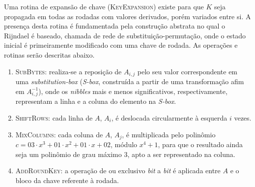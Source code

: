 \documentclass{ufsctex/ufsctex}
\begin{document}
Uma rotina de expansão de chave (\textsc{KeyExpansion}) existe para que $K$
seja propagada em todas as rodadas com valores derivados, porém variados entre
si. A presença desta rotina é fundamentada pela construção abstrata no qual o
Rijndael é baseado, chamada de rede de substituição-permutação, onde o estado
inicial é primeiramente modificado com uma chave de rodada. As operações e
rotinas serão descritas abaixo.

\begin{enumerate}[label=\roman*.]

  \item \textsc{SubBytes}: realiza-se a reposição de $A_{i,j}$ pelo seu valor
      correspondente em uma \emph{substitution-box} (\emph{S-box}, construída a
        partir de uma transformação afim em $A_{i,j}^{-1}$), onde os
        \emph{nibbles} mais e menos significativos, respectivamente,
        representam a linha e a coluna do elemento na \emph{S-box}.

  \item \textsc{ShiftRows}: cada linha de $A$, $A_i$, é deslocada circularmente
      à esquerda $i$ vezes.

  \item \textsc{MixColumns}: cada coluna de $A$, $A_j$, é multiplicada pelo
      polinômio $c = 03 \cdot x^{3} + 01 \cdot x^{2} + 01 \cdot x + 02$, módulo
        $x^{4} + 1$, para que o resultado ainda seja um polinômio de grau
        máximo 3, apto a ser representado na coluna.

  \item \textsc{AddRoundKey}: a operação de ou exclusivo \emph{bit} a
      \emph{bit} é aplicada entre $A$ e o bloco da chave referente à rodada.


\end{enumerate}
\end{document}
